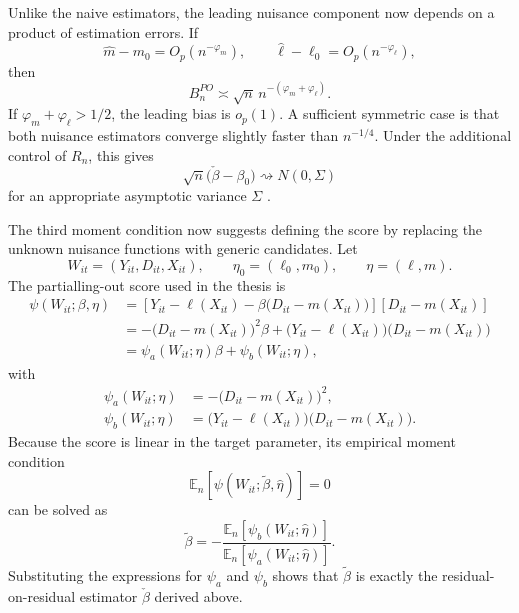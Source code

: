 \documentclass[11pt,oneside,a4paper]{book}
\begin{document}
Unlike the naive estimators, the leading nuisance component now depends on a product of estimation errors. If
\begin{equation*}
\widehat{m}-m_0
=
O_p(n^{-\varphi_m}),
\qquad
\widehat{\ell}-\ell_0
=
O_p(n^{-\varphi_{\ell}}),
\end{equation*}
then
\begin{equation*}
B_n^{PO}
\asymp
\sqrt{n}\,
n^{-(\varphi_m+\varphi_{\ell})}.
\end{equation*}
If \(\varphi_m+\varphi_{\ell}>1/2\), the leading bias is \(o_p(1)\). A sufficient symmetric case is that both nuisance estimators converge slightly faster than \(n^{-1/4}\). Under the additional control of \(R_n\), this gives
\begin{equation*}
\sqrt{n}\bigl(\check{\beta}-\beta_0\bigr)
\rightsquigarrow
N(0,\Sigma)
\end{equation*}
for an appropriate asymptotic variance \(\Sigma\) \citep{chernozhukov2018dml}.

The third moment condition now suggests defining the score by replacing the unknown nuisance functions with generic candidates. Let
\begin{equation*}
W_{it}=(Y_{it},D_{it},X_{it}),
\qquad
\eta_0=(\ell_0,m_0),
\qquad
\eta=(\ell,m).
\end{equation*}
The partialling-out score used in the thesis is
\begin{align*}
\psi(W_{it};\beta,\eta)
&=
\left[
Y_{it}-\ell(X_{it})
-\beta\bigl(D_{it}-m(X_{it})\bigr)
\right]
\left[
D_{it}-m(X_{it})
\right] \\
&=
-\bigl(D_{it}-m(X_{it})\bigr)^2\beta
+\bigl(Y_{it}-\ell(X_{it})\bigr)
\bigl(D_{it}-m(X_{it})\bigr) \\
&=
\psi_a(W_{it};\eta)\beta+\psi_b(W_{it};\eta),
\end{align*}
with
\begin{align*}
\psi_a(W_{it};\eta)
&=
-\bigl(D_{it}-m(X_{it})\bigr)^2, \\
\psi_b(W_{it};\eta)
&=
\bigl(Y_{it}-\ell(X_{it})\bigr)
\bigl(D_{it}-m(X_{it})\bigr).
\end{align*}
Because the score is linear in the target parameter, its empirical moment condition
\begin{equation*}
\mathbb{E}_n\!\left[
\psi(W_{it};\widetilde{\beta},\widehat{\eta})
\right]
=0
\end{equation*}
can be solved as
\begin{equation*}
\widetilde{\beta}
=
-\frac{
\mathbb{E}_n[\psi_b(W_{it};\widehat{\eta})]
}{
\mathbb{E}_n[\psi_a(W_{it};\widehat{\eta})]
}.
\end{equation*}
Substituting the expressions for \(\psi_a\) and \(\psi_b\) shows that \(\widetilde{\beta}\) is exactly the residual-on-residual estimator \(\check{\beta}\) derived above.
\end{document}
